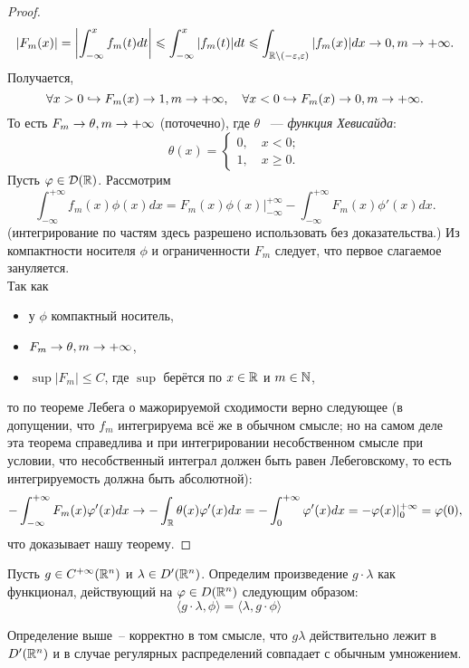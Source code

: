 \begin{proof}
    \[
        |F_m(x)| = \left|\int_{-\infty}^x f_m(t)dt\right| \leqslant \int_{-\infty}^x |f_m(t)|dt \leqslant \int_{\mathbb{R} \setminus (-\varepsilon, \varepsilon)} |f_m(x)|dx \rightarrow 0, m \rightarrow +\infty.
    \]
    Получается,
    \[
        \forall x > 0 \hookrightarrow F_m(x) \rightarrow 1, m \rightarrow +\infty, \quad \forall x < 0 \hookrightarrow F_m(x) \rightarrow 0, m \rightarrow +\infty.
    \]
    То есть $F_m \rightarrow \theta, m \rightarrow +\infty$ (поточечно), где $\theta$ ~--- \textit{функция Хевисайда}:
    \[
        \theta(x) = \begin{cases}
                        0,\quad x < 0; \\
                        1,\quad x \geq 0.
        \end{cases}
    \]
    Пусть $\varphi \in \mathcal{D}(\mathbb{R})$. Рассмотрим
    \[
        \int_{-\infty}^{+\infty} f_m(x)\phi(x)dx = F_m(x)\phi(x)\bigg|^{+\infty}_{-\infty} - \int_{-\infty}^{+\infty} F_m(x)\phi'(x)dx.
    \]
    (интегрирование по частям здесь разрешено использовать без доказательства.)
    Из компактности носителя $\phi$ и ограниченности $F_m$ следует, что первое слагаемое зануляется.\\
    Так как
    \begin{itemize}
        \item у $\phi$ компактный носитель,
        \item $F_m \rightarrow \theta, m \rightarrow +\infty$,
        \item $\sup |F_m| \leq C$, где $\sup$ берётся по $x\in \mathbb{R}$ и $m \in \mathbb{N}$,
    \end{itemize}
    то по теореме Лебега о мажорируемой сходимости верно следующее (в допущении, что $f_m$ интегрируема всё же в обычном смысле; но на самом деле эта теорема справедлива и при интегрировании несобственном смысле при условии, что несобственный интеграл должен быть равен Лебеговскому, то есть интегрируемость должна быть абсолютной):
    \[
        -\int_{-\infty}^{+\infty} F_m(x)\varphi'(x)dx \rightarrow -\int_{\mathbb{R}} \theta(x)\varphi'(x)dx = -\int_0^{+\infty} \varphi'(x)dx = -\varphi(x)|^{+\infty}_0 = \varphi(0),
    \]
    что доказывает нашу теорему.
\end{proof}
\begin{definition}
    Пусть $g \in C^{+\infty}(\mathbb{R}^n)$ и $\lambda \in D'(\mathbb{R}^n)$.
    Определим произведение $g\cdot\lambda$ как функционал, действующий на $\varphi \in D(\mathbb{R}^n)$ следующим образом:
    \[
        \langle g \cdot \lambda, \phi \rangle = \langle \lambda, g \cdot \phi \rangle \quad \tag{$\ast$}
    \]
\end{definition}
\begin{theorem}
    Определение выше~-- корректно в том смысле, что $g\lambda$ действительно лежит в $D'(\mathbb{R}^n)$ и в случае регулярных распределений совпадает с обычным умножением.
\end{theorem}
